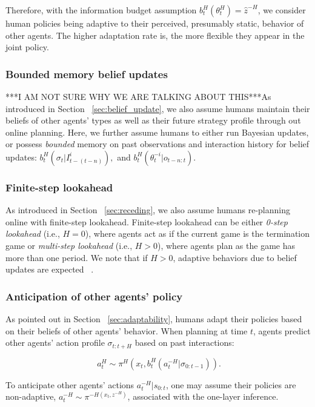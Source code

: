 \documentclass[letterpaper, 10 pt, conference]{ieeeconf}  %
\begin{document}
Therefore, with the information budget assumption $b^H_t(\theta^H_t) = \hat{z}^{-H}$, we consider human policies being adaptive to their perceived, presumably static, behavior of other agents. The higher adaptation rate is, the more flexible they 
appear in the joint policy. 

\color{red}\subsubsection{Bounded memory belief updates}

***I AM NOT SURE WHY WE ARE TALKING ABOUT THIS***As introduced in Section ~\ref{sec:belief_update}, we also assume humans maintain their 
beliefs of other agents' types as well as their future strategy profile through out online planning. Here, we further assume humans to either run Bayesian updates, or possess \textit{bounded} memory on past observations and interaction history for belief updates\cite{nikolaidis2016formalizing}: $b^H_t(\sigma_{t}|I^i_{t-(t-n)}),$ and $b^H_t(\theta^{-i}_t|o_{t-n:t})$.

\subsubsection{Finite-step lookahead}
As introduced in Section ~\ref{sec:receding}, we also assume humans re-planning online with finite-step lookahead. Finite-step lookahead can be either \textit{0-step lookahead} (i.e., $H=0$), where agents act as if the current game is the termination game or \textit{multi-step lookahead} (i.e., $H>0$), where agents plan as the game has more than one period. We note that if $H>0$, adaptive behaviors due to belief updates are expected ~\cite{nikolaidis2016formalizing}.

\subsubsection{Anticipation of other agents' policy}
As pointed out in Section ~\ref{sec:adaptability}, humans adapt their policies based on their beliefs of other agents' behavior. When planning at time $t$, agents predict other agents' action profile $\sigma_{t:t+H}$ based on past interactions:

\begin{equation}~\label{eq:human_decision1}
a^H_t \sim \pi^H(x_t, b^H_t(a^{-H}_{t}|\sigma_{0:t-1})).
\end{equation}

To anticipate other agents' actions $a^{-H}_{t}|s_{0:t}$, one may assume 
their policies are non-adaptive, $a^{-H}_t \sim \pi^{-H(x_t,z^{-H})}$, 
associated with the one-layer inference. 
\end{document}
